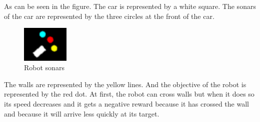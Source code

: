     As can be seen in the figure. The car is represented by a white square. The sonars of the car are represented by the three circles at the front of the car.
    
    \begin{figure}[!htb]
        \centering
        \includegraphics[width=0.2\textwidth]{imgs/robot.png}
        \caption{\label{fig:simulation} Robot sonars}
    \end{figure}
    

    The walls are represented by the yellow lines. And the objective of the robot is represented by the red dot. 
    At first, the robot can cross walls but when it does so its speed decreases and it gets a negative reward because it has crossed the wall and because it will arrive less quickly at its target.
